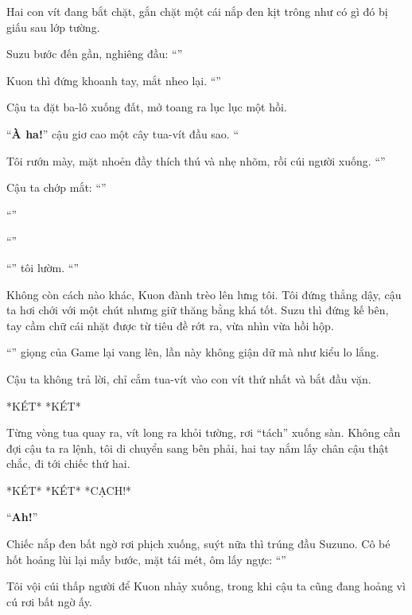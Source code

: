 \documentclass[../main.tex]{subfiles}
\begin{document}

Hai con vít đang bắt chặt, gắn chặt một cái nắp đen kịt trông như có gì đó bị giấu sau lớp tường.

Suzu bước đến gần, nghiêng đầu: ``''

Kuon thì đứng khoanh tay, mắt nheo lại. ``''

Cậu ta đặt ba-lô xuống đất, mở toang ra lục lục một hồi.

``\textbf{À ha!}'' cậu giơ cao một cây tua-vít đầu sao. ``

Tôi rướn mày, mặt nhoẻn đầy thích thú và nhẹ nhõm, rồi cúi người xuống. ``''

Cậu ta chớp mắt: ``''

``''

``''

``'' tôi lườm. ``''

Không còn cách nào khác, Kuon đành trèo lên lưng tôi. Tôi đứng thẳng dậy, cậu ta hơi chới với một chút nhưng giữ thăng bằng khá tốt. Suzu thì đứng kế bên, tay cầm chữ cái nhặt được từ tiêu đề rớt ra, vừa nhìn vừa hồi hộp.

``'' giọng của Game lại vang lên, lần này không giận dữ mà như kiểu lo lắng.

Cậu ta không trả lời, chỉ cắm tua-vít vào con vít thứ nhất và bắt đầu vặn.

*KÉT* *KÉT*

Từng vòng tua quay ra, vít long ra khỏi tường, rơi ``tách'' xuống sàn. Không cần đợi cậu ta ra lệnh, tôi di chuyển sang bên phải, hai tay nắm lấy chân cậu thật chắc, đi tới chiếc thứ hai.

*KÉT* *KÉT* *CẠCH!*

``\textbf{Ah!}''

Chiếc nắp đen bất ngờ rơi phịch xuống, suýt nữa thì trúng đầu Suzuno. Cô bé hốt hoảng lùi lại mấy bước, mặt tái mét, ôm lấy ngực: ``''

Tôi vội cúi thấp người để Kuon nhảy xuống, trong khi cậu ta cũng đang hoảng vì cú rơi bất ngờ ấy.
\end{document}
